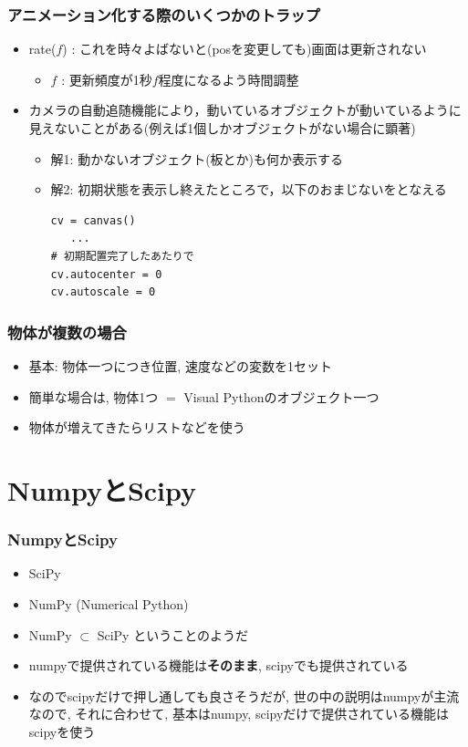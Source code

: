 \documentclass[10pt,dvipdfmx]{beamer}
\begin{document}
\begin{frame}[fragile]
\frametitle{アニメーション化する際のいくつかのトラップ}

\begin{itemize}
\item rate($f$) : これを時々よばないと(posを変更しても)画面は更新されない
  \begin{itemize}
  \item $f$ : 更新頻度が1秒$f$程度になるよう時間調整
  \end{itemize}

\item カメラの自動追随機能により，動いているオブジェクトが動いているように見えないことがある(例えば1個しかオブジェクトがない場合に顕著)
  \begin{itemize}
  \item 解1: 動かないオブジェクト(板とか)も何か表示する
  \item 解2: 初期状態を表示し終えたところで，以下のおまじないをとなえる
\begin{lstlisting}
cv = canvas()
   ...
# 初期配置完了したあたりで
cv.autocenter = 0 
cv.autoscale = 0      
\end{lstlisting}
  \end{itemize}
\end{itemize}
\end{frame}


\begin{frame}[fragile]
\frametitle{物体が複数の場合}

\begin{itemize}
\item 基本: 物体一つにつき位置, 速度などの変数を1セット
\item 簡単な場合は, 物体1つ $=$ Visual Pythonのオブジェクト一つ
\item 物体が増えてきたらリストなどを使う
\end{itemize}

\end{frame}


\section{NumpyとScipy}
\begin{frame}
\frametitle{NumpyとScipy}
\begin{itemize}
\item SciPy
\item NumPy (Numerical Python)
\item NumPy $\subset$ SciPy ということのようだ
\item numpyで提供されている機能は{\bf そのまま}, 
  scipyでも提供されている
\item なのでscipyだけで押し通しても良さそうだが,
  世の中の説明はnumpyが主流なので, それに合わせて,
  基本はnumpy, scipyだけで提供されている機能はscipyを使う
\end{itemize}

\end{frame}
\end{document}

